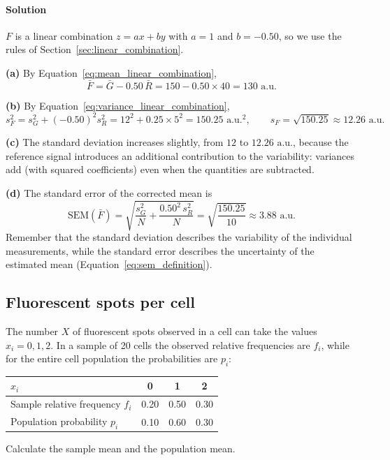 \paragraph{Solution} $F$ is a linear combination $z = ax + by$ with $a = 1$ and $b = -0.50$, so we use the rules of Section~\ref{sec:linear_combination}.

\textbf{(a)} By Equation~\eqref{eq:mean_linear_combination},
\begin{equation*}
\bar{F} = \bar{G} - 0.50\,\bar{R} = 150 - 0.50 \times 40 = 130\text{ a.u.}
\end{equation*}

\textbf{(b)} By Equation~\eqref{eq:variance_linear_combination},
\begin{equation*}
s_F^2 = s_G^2 + (-0.50)^2s_R^2 = 12^2 + 0.25 \times 5^2 = 150.25\text{ a.u.}^2, \qquad s_F = \sqrt{150.25} \approx 12.26\text{ a.u.}
\end{equation*}

\textbf{(c)} The standard deviation increases slightly, from $12$ to $12.26\text{ a.u.}$, because the reference signal introduces an additional contribution to the variability: variances add (with squared coefficients) even when the quantities are subtracted.

\textbf{(d)} The standard error of the corrected mean is
\begin{equation*}
\text{SEM}(\bar{F}) = \sqrt{\frac{s_G^2}{N} + \frac{0.50^2\,s_R^2}{N}} = \sqrt{\frac{150.25}{10}} \approx 3.88\text{ a.u.}
\end{equation*}
Remember that the standard deviation describes the variability of the individual measurements, while the standard error describes the uncertainty of the estimated mean (Equation~\eqref{eq:sem_definition}).

\subsection{Fluorescent spots per cell}
\label{ex:fluorescent_spots}

The number $X$ of fluorescent spots observed in a cell can take the values $x_i = 0, 1, 2$. In a sample of 20 cells the observed relative frequencies are $f_i$, while for the entire cell population the probabilities are $p_i$:
\begin{center}
\begin{tabular}{lccc}
\toprule
$x_i$ & 0 & 1 & 2 \\
\midrule
Sample relative frequency $f_i$ & 0.20 & 0.50 & 0.30 \\
Population probability $p_i$ & 0.10 & 0.60 & 0.30 \\
\bottomrule
\end{tabular}
\end{center}
Calculate the sample mean and the population mean.

